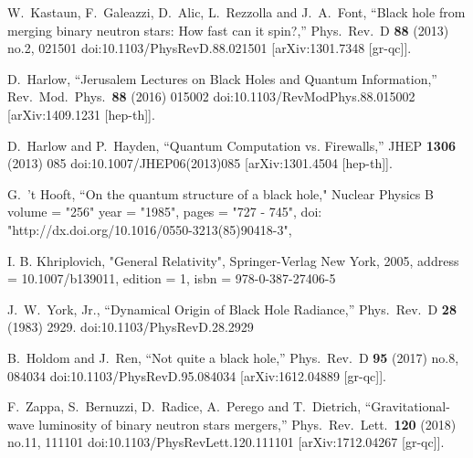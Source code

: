 \documentclass[a4paper,11pt]{article}
\begin{document}
\begin{thebibliography}{99}
  W.~Kastaun, F.~Galeazzi, D.~Alic, L.~Rezzolla and J.~A.~Font,
  ``Black hole from merging binary neutron stars: How fast can it spin?,''
  Phys.\ Rev.\ D {\bf 88} (2013) no.2,  021501
  doi:10.1103/PhysRevD.88.021501
  [arXiv:1301.7348 [gr-qc]].
  
  D.~Harlow,
  ``Jerusalem Lectures on Black Holes and Quantum Information,''
  Rev.\ Mod.\ Phys.\  {\bf 88} (2016) 015002
  doi:10.1103/RevModPhys.88.015002
  [arXiv:1409.1231 [hep-th]].
  
  D.~Harlow and P.~Hayden,
  ``Quantum Computation vs. Firewalls,''
  JHEP {\bf 1306} (2013) 085
  doi:10.1007/JHEP06(2013)085
  [arXiv:1301.4504 [hep-th]].

  G.~'t Hooft,
  ``On the quantum structure of a black hole,"
  Nuclear Physics B
  volume = "256"
  year = "1985",
  pages = "727 - 745",
  doi: "http://dx.doi.org/10.1016/0550-3213(85)90418-3",

  I. B. Khriplovich, 
  "General Relativity",
  Springer-Verlag New York,
  2005,
  address   = {10.1007/b139011},
  edition   = 1,
  isbn      = {978-0-387-27406-5}

  J.~W.~York, Jr.,
  ``Dynamical Origin of Black Hole Radiance,''
  Phys.\ Rev.\ D {\bf 28} (1983) 2929.
  doi:10.1103/PhysRevD.28.2929

  B.~Holdom and J.~Ren,
  ``Not quite a black hole,''
  Phys.\ Rev.\ D {\bf 95} (2017) no.8,  084034
  doi:10.1103/PhysRevD.95.084034
  [arXiv:1612.04889 [gr-qc]].
  
  F.~Zappa, S.~Bernuzzi, D.~Radice, A.~Perego and T.~Dietrich,
  ``Gravitational-wave luminosity of binary neutron stars mergers,''
  Phys.\ Rev.\ Lett.\  {\bf 120} (2018) no.11,  111101
  doi:10.1103/PhysRevLett.120.111101
  [arXiv:1712.04267 [gr-qc]].


\end{thebibliography}
\end{document}
